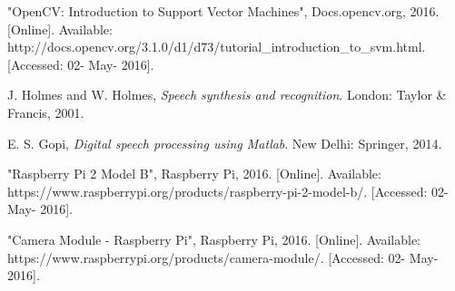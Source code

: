 \documentclass[journal,twoside]{IEEEtran}
\begin{document}
\begin{thebibliography}{1}
        "OpenCV: Introduction to Support Vector Machines", 
        Docs.opencv.org, 2016. [Online]. 
        Available: http://docs.opencv.org/3.1.0/d1/d73/tutorial\_introduction\_to\_svm.html. [Accessed: 02- May- 2016].

        J.  Holmes and W.  Holmes, 
        \emph{Speech synthesis and recognition}. 
        London: Taylor \& Francis, 2001.

        E. S. Gopi, 
        \emph{Digital speech processing using Matlab}. New Delhi: Springer, 2014. 

        "Raspberry Pi 2 Model B", Raspberry Pi, 2016. 
        [Online]. Available: https://www.raspberrypi.org/products/raspberry-pi-2-model-b/. [Accessed: 02- May- 2016].

        "Camera Module - Raspberry Pi", 
        Raspberry Pi, 2016. [Online]. 
        Available: https://www.raspberrypi.org/products/camera-module/. [Accessed: 02- May- 2016].

\end{thebibliography}

% 






\end{document}
